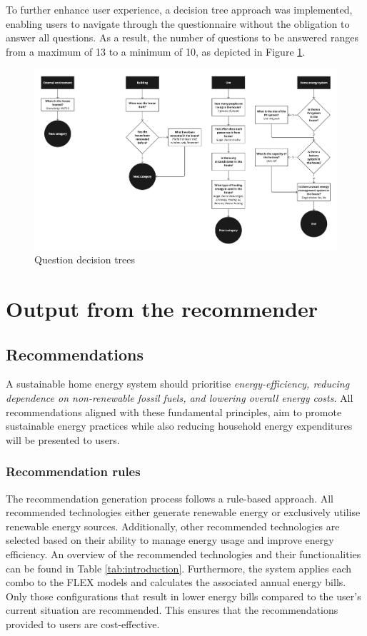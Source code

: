 To further enhance user experience, a decision tree approach was implemented, enabling users to navigate through the questionnaire without the obligation to answer all questions.
As a result, the number of questions to be answered ranges from a maximum of 13 to a minimum of 10, as depicted in Figure \ref{fig:trees}. 
\begin{figure}[h!]
  \centering
  \includegraphics[width=\textwidth]{Images/trees.jpg}
  \caption{Question decision trees}
  \label{fig:trees}
\end{figure}


\section{Output from the recommender}


\subsection{Recommendations}

A sustainable home energy system should prioritise 
\emph{energy-efficiency, reducing dependence on non-renewable fossil fuels, and lowering overall energy costs}. 
All recommendations aligned with these fundamental principles, 
aim to promote sustainable energy practices while also reducing household energy expenditures will be presented to users. 


\subsubsection{Recommendation rules}

The recommendation generation process follows a rule-based approach. 
All recommended technologies either generate renewable energy or exclusively utilise renewable energy sources. 
Additionally, other recommended technologies are selected based on their ability to manage energy usage and improve energy efficiency. 
An overview of the recommended technologies and their functionalities can be found in Table \ref{tab:introduction}.
Furthermore, the system applies each combo to the FLEX models and calculates the associated annual energy bills. 
Only those configurations that result in lower energy bills compared to the user's current situation are recommended. 
This ensures that the recommendations provided to users are cost-effective. 


